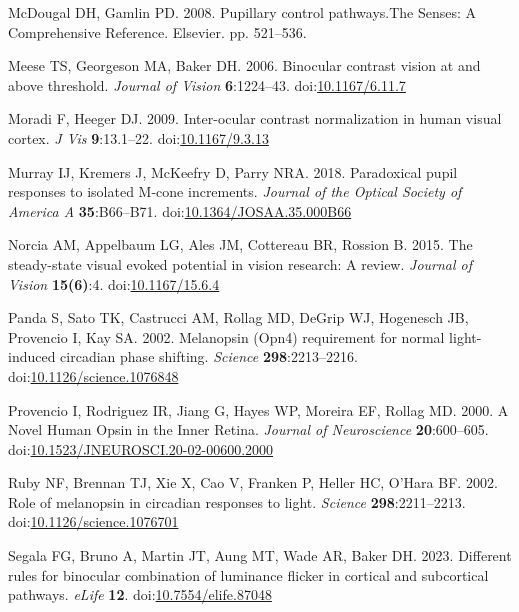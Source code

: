 \documentclass[
]{article}
\newlength{\cslhangindent}
\newlength{\cslentryspacingunit} %
\newenvironment{CSLReferences}[2] %
 {%
  \setlength{\parindent}{0pt}
  \ifodd #1
  \let\oldpar\par
  \def\par{\hangindent=\cslhangindent\oldpar}
  \fi
  \setlength{\parskip}{#2\cslentryspacingunit}
 }%
 {}
\begin{document}
\begin{CSLReferences}{1}{0}
\leavevmode{}%
McDougal DH, Gamlin PD. 2008. Pupillary control pathways.The Senses: A Comprehensive Reference. Elsevier. pp. 521--536.

\leavevmode{}%
Meese TS, Georgeson MA, Baker DH. 2006. Binocular contrast vision at and above threshold. \emph{Journal of Vision} \textbf{6}:1224--43. doi:\href{https://doi.org/10.1167/6.11.7}{10.1167/6.11.7}

\leavevmode{}%
Moradi F, Heeger DJ. 2009. Inter-ocular contrast normalization in human visual cortex. \emph{J Vis} \textbf{9}:13.1--22. doi:\href{https://doi.org/10.1167/9.3.13}{10.1167/9.3.13}

\leavevmode{}%
Murray IJ, Kremers J, McKeefry D, Parry NRA. 2018. Paradoxical pupil responses to isolated {M}-cone increments. \emph{Journal of the Optical Society of America A} \textbf{35}:B66--B71. doi:\href{https://doi.org/10.1364/JOSAA.35.000B66}{10.1364/JOSAA.35.000B66}

\leavevmode{}%
Norcia AM, Appelbaum LG, Ales JM, Cottereau BR, Rossion B. 2015. The steady-state visual evoked potential in vision research: A review. \emph{Journal of Vision} \textbf{15(6)}:4. doi:\href{https://doi.org/10.1167/15.6.4}{10.1167/15.6.4}

\leavevmode{}%
Panda S, Sato TK, Castrucci AM, Rollag MD, DeGrip WJ, Hogenesch JB, Provencio I, Kay SA. 2002. Melanopsin (Opn4) requirement for normal light-induced circadian phase shifting. \emph{Science} \textbf{298}:2213--2216. doi:\href{https://doi.org/10.1126/science.1076848}{10.1126/science.1076848}

\leavevmode{}%
Provencio I, Rodriguez IR, Jiang G, Hayes WP, Moreira EF, Rollag MD. 2000. A {Novel} {Human} {Opsin} in the {Inner} {Retina}. \emph{Journal of Neuroscience} \textbf{20}:600--605. doi:\href{https://doi.org/10.1523/JNEUROSCI.20-02-00600.2000}{10.1523/JNEUROSCI.20-02-00600.2000}

\leavevmode{}%
Ruby NF, Brennan TJ, Xie X, Cao V, Franken P, Heller HC, O'Hara BF. 2002. Role of melanopsin in circadian responses to light. \emph{Science} \textbf{298}:2211--2213. doi:\href{https://doi.org/10.1126/science.1076701}{10.1126/science.1076701}

\leavevmode{}%
Segala FG, Bruno A, Martin JT, Aung MT, Wade AR, Baker DH. 2023. Different rules for binocular combination of luminance flicker in cortical and subcortical pathways. \emph{eLife} \textbf{12}. doi:\href{https://doi.org/10.7554/elife.87048}{10.7554/elife.87048}


\end{CSLReferences}
\end{document}

